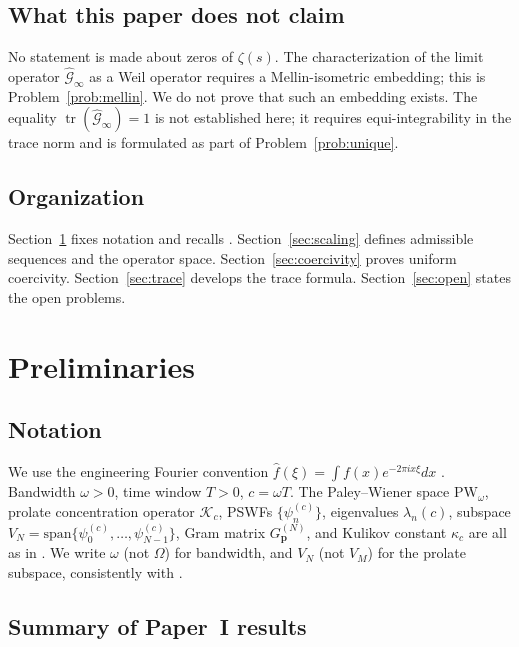 \documentclass[12pt,a4paper]{amsart}
\theoremstyle{definition}
\newcommand{\PW}{\mathrm{PW}_\omega}
\newcommand{\Kop}{\mathcal{K}_c}
\newcommand{\Kul}{\kappa_c}
\newcommand{\GVM}{G^{(N)}_{\mathbf{p}}}
\newcommand{\psin}{\psi_n^{(c)}}
\newcommand{\Gcal}{\widehat{\mathcal{G}}}
\begin{document}
\subsection{What this paper does not claim}

No statement is made about zeros of $\zeta(s)$.
The characterization of the limit operator $\Gcal_\infty$ as a Weil
operator requires a Mellin-isometric embedding; this is Problem~\ref{prob:mellin}.
We do not prove that such an embedding exists.
The equality $\operatorname{tr}(\Gcal_\infty)=1$ is not established
here; it requires equi-integrability in the trace norm and is
formulated as part of Problem~\ref{prob:unique}.

\subsection{Organization}

Section~\ref{sec:prelim} fixes notation and recalls \cite{PaperI}.
Section~\ref{sec:scaling} defines admissible sequences and the
operator space.
Section~\ref{sec:coercivity} proves uniform coercivity.
Section~\ref{sec:trace} develops the trace formula.
Section~\ref{sec:open} states the open problems.

\section{Preliminaries}\label{sec:prelim}

\subsection{Notation}

We use the engineering Fourier convention
$\widehat{f}(\xi)=\int f(x)e^{-2\pi ix\xi}dx$ \cite{BonamiKaroui,PaperI}.
Bandwidth $\omega>0$, time window $T>0$, $c=\omega T$.
The Paley--Wiener space $\PW$, prolate concentration operator $\Kop$,
PSWFs $\{\psin\}$, eigenvalues $\lambda_n(c)$, subspace
$V_N=\mathrm{span}\{\psi_0^{(c)},\ldots,\psi_{N-1}^{(c)}\}$,
Gram matrix $\GVM$, and Kulikov constant $\Kul$ are all as
in \cite{PaperI}. We write $\omega$ (not $\Omega$) for bandwidth,
and $V_N$ (not $V_M$) for the prolate subspace, consistently
with \cite{PaperI}.

\subsection{Summary of Paper~I results}
\end{document}
